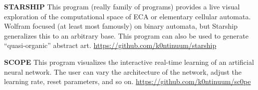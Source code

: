 \documentclass{article}
\renewcommand{\b}{\textbf}
\newcommand{\q}{\enquote}
\begin{document}
{{\b{STARSHIP} \quad This program (really family of programs) provides a live visual exploration of the computational space of ECA or elementary cellular automata. Wolfram focused (at least most famously) on binary automata, but Starship generalizes this to an arbitrary base. This program can also be used to generate \q{quasi-organic} abstract art. \quad \url{https://github.com/k0ntinuum/starship}

\b{SCOPE} \quad This program visualizes the interactive real-time learning of an artificial neural network. The user can vary the architecture of the network, adjust the learning rate, reset parameters, and so on. \url{https://github.com/k0ntinuum/sc0pe}  





}}
\end{document}
